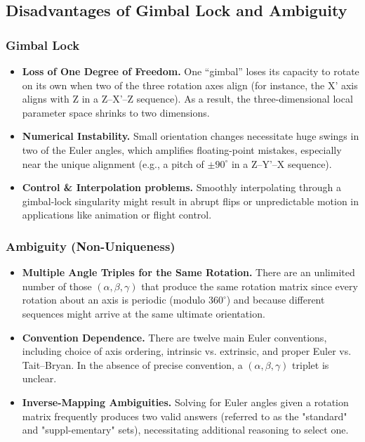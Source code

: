 \documentclass[12pt]{article}
\begin{document}
\subsection{Disadvantages of Gimbal Lock and Ambiguity}
\subsubsection{Gimbal Lock}
\begin{itemize}
  \item \textbf{Loss of One Degree of Freedom.} 
   One ``gimbal'' loses its capacity to rotate on its own when two of the three rotation axes align (for instance, the X' axis aligns with Z in a Z–X'–Z sequence).  As a result, the three-dimensional local parameter space shrinks to two dimensions\cite{ref20}.
  \item \textbf{Numerical Instability.} 
    Small orientation changes necessitate huge swings in two of the Euler angles, which amplifies floating-point mistakes, especially near the unique alignment (e.g., a pitch of $\pm90^\circ$ in a Z–Y'–X sequence)\cite{ref20}.
  \item \textbf{Control \& Interpolation problems.} 
    Smoothly interpolating through a gimbal-lock singularity might result in abrupt flips or unpredictable motion in applications like animation or flight control\cite{ref20}.
\end{itemize}

\subsubsection{Ambiguity (Non-Uniqueness)}
\begin{itemize}
  \item \textbf{Multiple Angle Triples for the Same Rotation.} 
   There are an unlimited number of those \((\alpha,\beta,\gamma)\) that produce the same rotation matrix since every rotation about an axis is periodic (modulo \(360^\circ\)) and because different sequences might arrive at the same ultimate orientation\cite{ref20}.
  \item \textbf{Convention Dependence.} 
    There are twelve main Euler conventions, including choice of axis ordering, intrinsic vs. extrinsic, and proper Euler vs. Tait–Bryan.  In the absence of precise convention, a \((\alpha,\beta,\gamma)\) triplet is unclear\cite{ref20}.
  \item \textbf{Inverse-Mapping Ambiguities.} 
   Solving for Euler angles given a rotation matrix frequently produces two valid answers (referred to as the "standard" and "suppl-ementary" sets), necessitating additional reasoning to select one\cite{ref20}.
\end{itemize}
\end{document}
